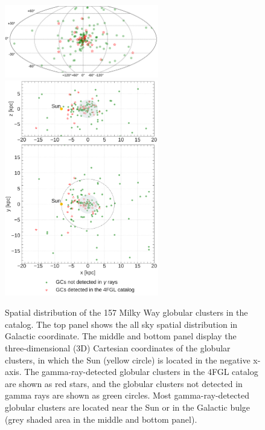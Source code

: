 \documentclass[doublespace,nopageskip]{VTthesis}
\begin{document}
\begin{figure}
    \centering
    \includegraphics[width=0.6\textwidth]{Figures/Globular/AllSky_map.pdf}
    \includegraphics[width=0.6\textwidth]{Figures/Globular/distance_map.pdf}
    \caption{Spatial distribution of the 157 Milky Way globular clusters in the \citet{1996AJ....112.1487H} catalog. The top panel shows  the all sky spatial distribution in Galactic coordinate. The middle and bottom panel display the three-dimensional (3D) Cartesian %
    coordinates of the globular clusters, in which %
    the Sun (yellow circle) is located in the negative x-axis. The gamma-ray-detected globular clusters in the 4FGL catalog are shown as red stars, %
    and the globular clusters not detected in gamma rays are shown as green circles. Most gamma-ray-detected globular clusters are located near the Sun or in the Galactic bulge (grey shaded area in the middle and bottom panel).}
    \label{fig:all_sky_distribution}
\end{figure}
\end{document}
